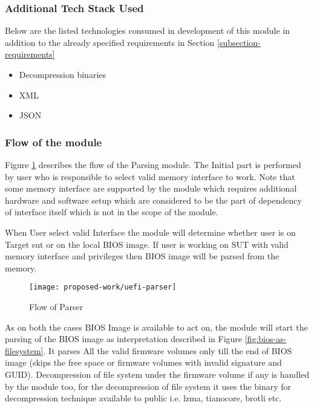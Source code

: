\subsubsection{Additional Tech Stack Used}
Below are the listed technologies consumed in development of this module in addition to the already specified requirements in Section \ref{subsection-requirements}
\begin{itemize}
	\item Decompression binaries
	\item XML
	\item JSON
\end{itemize}

\subsubsection{Flow of the module}
Figure \ref{fig:uefi-parser} describes the flow of the Parsing module. The Initial part is performed by user who is responsible to select valid memory interface to work. Note that some memory interface are supported by the module which requires additional hardware and software setup which are considered to be the part of dependency of interface itself which is not in the scope of the module.

When User select valid Interface the module will determine whether user is on Target \gls{sut} or on the local BIOS image.
If user is working on SUT with valid memory interface and privileges then BIOS image will be parsed from the memory.

\begin{figure}[!htbp]
	\centering
	\texttt{[image: proposed-work/uefi-parser]}
	\caption{Flow of Parser}\label{fig:uefi-parser}
\end{figure}

As on both the cases BIOS Image is available to act on, the module will start the parsing of the BIOS image as interpretation described in Figure \ref{fig:bios-as-filesystem}. It parses All the valid firmware volumes only till the end of BIOS image (skips the free space or firmware volumes with invalid signature and GUID). Decompression of file system under the firmware volume if any is handled by the module too, for the decompression of file system it uses the binary for decompression technique available to public i.e. lzma, tianocore, brotli etc.


